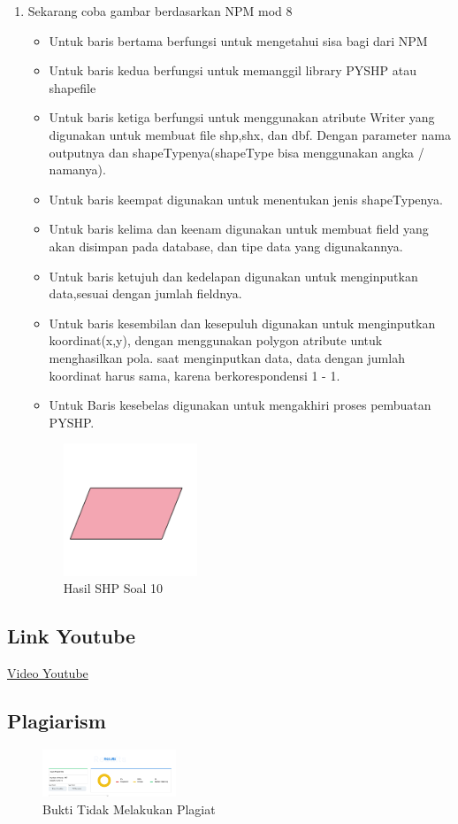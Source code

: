\begin{enumerate}
	\item Sekarang coba gambar berdasarkan NPM mod 8
	
	\begin{itemize}
		\item Untuk baris bertama berfungsi untuk mengetahui sisa bagi dari NPM
		\item Untuk baris kedua berfungsi untuk memanggil library PYSHP atau shapefile
		\item Untuk baris ketiga berfungsi untuk menggunakan atribute Writer yang digunakan untuk membuat file shp,shx, dan dbf. \hfill\break Dengan parameter nama outputnya dan shapeTypenya(shapeType bisa menggunakan angka / namanya).
		\item Untuk baris keempat digunakan untuk menentukan jenis shapeTypenya.
		\item Untuk baris kelima dan keenam digunakan untuk membuat field yang akan disimpan pada database, dan tipe data yang digunakannya.
		\item Untuk baris ketujuh dan kedelapan digunakan untuk menginputkan data,sesuai dengan jumlah fieldnya.
		\item Untuk baris kesembilan dan kesepuluh digunakan untuk menginputkan koordinat(x,y), dengan menggunakan polygon atribute untuk menghasilkan pola. \hfill\break
		saat menginputkan data, data dengan jumlah koordinat harus sama, karena berkorespondensi 1 - 1.
		\item Untuk Baris kesebelas digunakan untuk mengakhiri proses pembuatan PYSHP.
	\end{itemize}
	\hfill\break
	\begin{figure}[H]
		\includegraphics[width=4cm]{figures/1174004/2/10.png}
		\centering
		\caption{Hasil SHP Soal 10}
	\end{figure}
\end{enumerate}
\subsection{Link Youtube}
\href{https://youtu.be/6XXwp9FaEyA}{Video Youtube}
\subsection{Plagiarism}
\begin{figure}[H]
	\includegraphics[width=4cm]{figures/1174004/2/plagiat.png}
	\centering
	\caption{Bukti Tidak Melakukan Plagiat}
\end{figure}